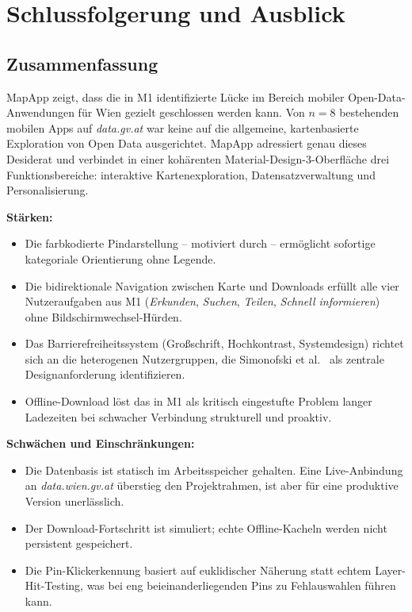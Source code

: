 \section{Schlussfolgerung und Ausblick}

\subsection{Zusammenfassung}

MapApp zeigt, dass die in M1 identifizierte Lücke im Bereich mobiler
Open-Data-Anwendungen für Wien gezielt geschlossen werden kann.
Von $n = 8$ bestehenden mobilen Apps auf \textit{data.gv.at} war keine
auf die allgemeine, kartenbasierte Exploration von Open Data ausgerichtet.
MapApp adressiert genau dieses Desiderat und verbindet in einer kohärenten
Material-Design-3-Oberfläche drei Funktionsbereiche:
interaktive Kartenexploration, Datensatzverwaltung und Personalisierung.

\textbf{Stärken:}
\begin{itemize}
  \item Die farbkodierte Pindarstellung – motiviert durch \cite{Visualization} –
        ermöglicht sofortige kategoriale Orientierung ohne Legende.
  \item Die bidirektionale Navigation zwischen Karte und Downloads
        erfüllt alle vier Nutzeraufgaben aus M1 (\textit{Erkunden},
        \textit{Suchen}, \textit{Teilen}, \textit{Schnell informieren})
        ohne Bildschirmwechsel-Hürden.
  \item Das Barrierefreiheitssystem (Großschrift, Hochkontrast, Systemdesign)
        richtet sich an die heterogenen Nutzergruppen, die Simonofski et al.\
        \cite{simonofski2022} als zentrale Designanforderung identifizieren.
  \item Offline-Download löst das in M1 als kritisch eingestufte Problem
        langer Ladezeiten bei schwacher Verbindung strukturell und proaktiv.
\end{itemize}

\textbf{Schwächen und Einschränkungen:}
\begin{itemize}
  \item Die Datenbasis ist statisch im Arbeitsspeicher gehalten.
        Eine Live-Anbindung an \textit{data.wien.gv.at} \cite{datawien}
        überstieg den Projektrahmen, ist aber für eine produktive Version
        unerlässlich.
  \item Der Download-Fortschritt ist simuliert; echte Offline-Kacheln
        werden nicht persistent gespeichert.
  \item Die Pin-Klickerkennung basiert auf euklidischer Näherung statt
        echtem Layer-Hit-Testing, was bei eng beieinanderliegenden Pins
        zu Fehlauswahlen führen kann.
\end{itemize}

